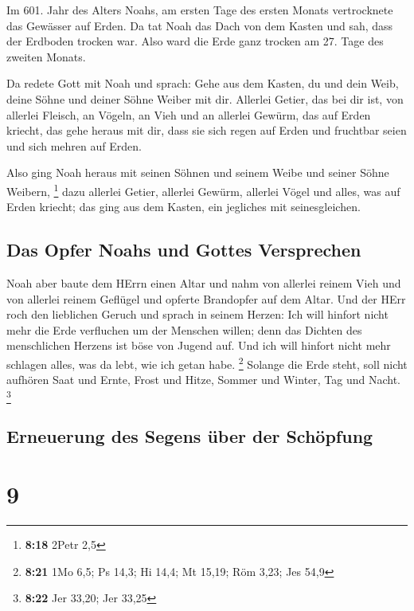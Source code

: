  Im 601. Jahr des Alters Noahs, am ersten Tage des ersten
Monats vertrocknete das Gewässer auf Erden. Da tat Noah das Dach von dem
Kasten und sah, dass der Erdboden trocken war.  Also ward
die Erde ganz trocken am 27. Tage des zweiten Monats.

 Da redete Gott mit Noah und sprach:  Gehe
aus dem Kasten, du und dein Weib, deine Söhne und deiner Söhne Weiber
mit dir.  Allerlei Getier, das bei dir ist, von allerlei
Fleisch, an Vögeln, an Vieh und an allerlei Gewürm, das auf Erden
kriecht, das gehe heraus mit dir, dass sie sich regen auf Erden und
fruchtbar seien und sich mehren auf Erden.

 Also ging Noah heraus mit seinen Söhnen und seinem Weibe
und seiner Söhne Weibern, \footnote{\textbf{8:18} 2Petr 2,5}
 dazu allerlei Getier, allerlei Gewürm, allerlei Vögel
und alles, was auf Erden kriecht; das ging aus dem Kasten, ein jegliches
mit seinesgleichen.

\hypertarget{das-opfer-noahs-und-gottes-versprechen}{%
\subsection{Das Opfer Noahs und Gottes
Versprechen}\label{das-opfer-noahs-und-gottes-versprechen}}

 Noah aber baute dem HErrn einen Altar und nahm von
allerlei reinem Vieh und von allerlei reinem Geflügel und opferte
Brandopfer auf dem Altar.  Und der HErr roch den
lieblichen Geruch und sprach in seinem Herzen: Ich will hinfort nicht
mehr die Erde verfluchen um der Menschen willen; denn das Dichten des
menschlichen Herzens ist böse von Jugend auf. Und ich will hinfort nicht
mehr schlagen alles, was da lebt, wie ich getan habe. \footnote{\textbf{8:21}
  1Mo 6,5; Ps 14,3; Hi 14,4; Mt 15,19; Röm 3,23; Jes 54,9}
 Solange die Erde steht, soll nicht aufhören Saat und
Ernte, Frost und Hitze, Sommer und Winter, Tag und Nacht. \footnote{\textbf{8:22}
  Jer 33,20; Jer 33,25}

\hypertarget{erneuerung-des-segens-uxfcber-der-schuxf6pfung}{%
\subsection{Erneuerung des Segens über der
Schöpfung}\label{erneuerung-des-segens-uxfcber-der-schuxf6pfung}}

\hypertarget{section-8}{%
\section{9}\label{section-8}}

